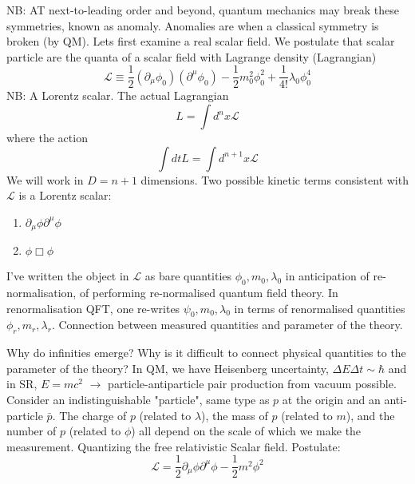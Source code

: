 NB: AT next-to-leading order and beyond, quantum mechanics may break these symmetries, known as anomaly. Anomalies are when a classical symmetry is broken (by QM). Lets first examine a real scalar field. We postulate that scalar particle are the quanta of a scalar field with Lagrange density (Lagrangian)
\begin{equation}
    \mathcal{L} \equiv \frac{1}{2} (\partial_{\mu} \phi_0) (\partial^\mu \phi_0) - \frac{1}{2} m_{0}^{2} \phi_{0}^{2} + \frac{1}{4!} \lambda_0 \phi_{0}^{4}
\end{equation}
NB: A Lorentz scalar. The actual Lagrangian 
\begin{equation}
    L = \int d^n x \mathcal{L}
\end{equation}
where the action
\begin{equation}
    \int dt L = \int d^{n+1} x \mathcal{L}
\end{equation}
We will work in $D = n+1$ dimensions. Two possible kinetic terms consistent with $\mathcal{L}$ is a Lorentz scalar:
\begin{enumerate}
    \item $\partial_{\mu} \phi \partial^\mu \phi$
    \item $\phi \Box \phi$ 
\end{enumerate}
I've written the object in $\mathcal{L}$ as bare quantities $\phi_0, m_0, \lambda_0$ in anticipation of re-normalisation, of performing re-normalised quantum field theory. In renormalisation QFT, one re-writes $\psi_0, m_0, \lambda_0$ in terms of renormalised quantities $\phi_r, m_r, \lambda_r$. Connection between measured quantities and parameter of the theory. 

Why do infinities emerge? Why is it difficult to connect physical quantities to the parameter of the theory? In QM, we have Heisenberg uncertainty, $\Delta E \Delta t \sim \hbar$ and in SR, $E = mc^2$ $\to$ particle-antiparticle pair production from vacuum possible. Consider an indistinguishable "particle", same type as $p$ at the origin and an anti-particle $\bar{p}$. The charge of $p$ (related to $\lambda$), the mass of $p$ (related to $m$), and the number of $p$ (related to $\phi$) all depend on the scale of which we make the measurement. Quantizing the free relativistic Scalar field. Postulate:
\begin{equation}\label{new_eq_1}
    \mathcal{L} = \frac{1}{2} \partial_\mu \phi \partial^\mu \phi - \frac{1}{2}m^2 \phi^2
 \end{equation}

